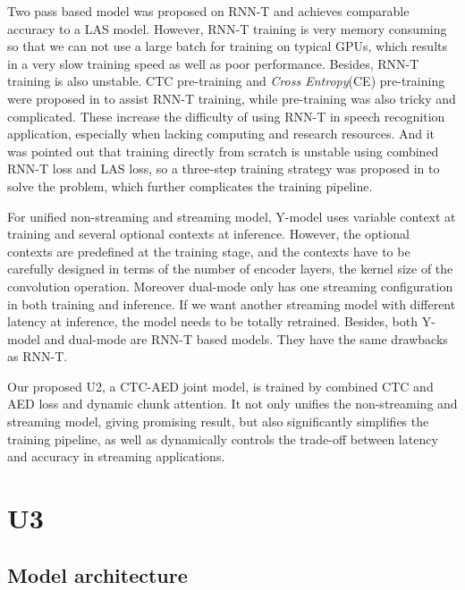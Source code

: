 \documentclass[a4paper]{article}
\begin{document}
Two pass based model\cite{sainath2019two}  was proposed on RNN-T and achieves comparable accuracy to a LAS model. 
However, RNN-T training is very memory consuming\cite{li2019improving} so that we can not use a large batch for training on typical GPUs, which results in a very slow training speed as well as poor performance. Besides, RNN-T training is also unstable. CTC pre-training  \cite{rao2017exploring} and \textit{Cross Entropy}(CE) pre-training were proposed in \cite{hu2020exploring} to assist RNN-T training, while pre-training was also tricky and complicated. These increase the difficulty of using RNN-T in speech recognition application, especially when lacking computing and research resources.
And it was pointed out that training directly from scratch is unstable using combined RNN-T loss and LAS loss, so a three-step training strategy was proposed in \cite{sainath2019two} to solve the problem, which further complicates the training pipeline.

For unified non-streaming and streaming model,
Y-model uses variable context at training and several optional contexts at inference. However, the optional contexts are predefined at the training stage, and the contexts have to be carefully designed in terms of the number of encoder layers, the kernel size of the convolution operation.
Moreover dual-mode only has one streaming configuration in both training and inference. If we want another streaming model with different latency at inference, the model needs to be totally retrained. Besides, both Y-model and dual-mode are RNN-T based models. They have the same drawbacks as RNN-T.

Our proposed U2, a CTC-AED joint model, is trained by combined CTC and AED loss and dynamic chunk attention. It not only unifies the non-streaming and streaming model, giving promising result, but also significantly simplifies the training pipeline, as well as dynamically controls the trade-off between latency and accuracy in streaming applications.

\section{U3}

\subsection{Model architecture}
\end{document}
